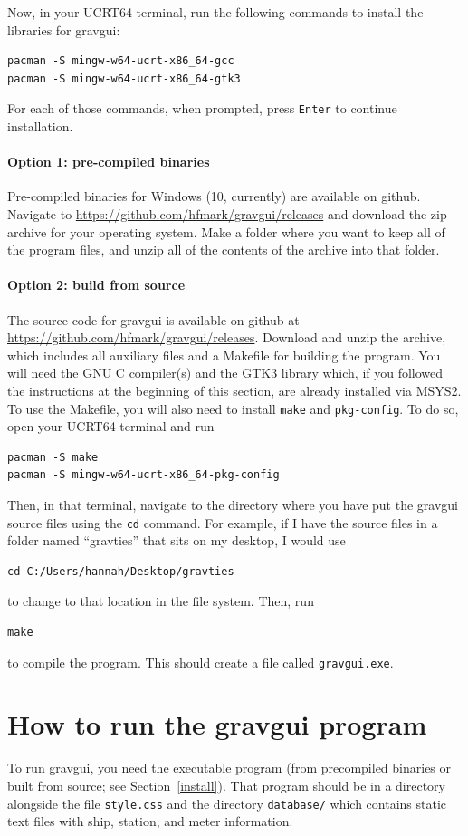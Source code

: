 \documentclass{pfpe-manual}
\begin{document}
Now, in your UCRT64 terminal, run the following commands to install the libraries for gravgui:
\begin{verbatim}
pacman -S mingw-w64-ucrt-x86_64-gcc
pacman -S mingw-w64-ucrt-x86_64-gtk3
\end{verbatim}
For each of those commands, when prompted, press \texttt{Enter} to continue installation.

\paragraph{Option 1: pre-compiled binaries}
Pre-compiled binaries for Windows (10, currently) are available on github. Navigate to \url{https://github.com/hfmark/gravgui/releases} and download the zip archive for your operating system. Make a folder where you want to keep all of the program files, and unzip all of the contents of the archive into that folder.

\paragraph{Option 2: build from source}
The source code for gravgui is available on github at \url{https://github.com/hfmark/gravgui/releases}. Download and unzip the archive, which includes all auxiliary files and a Makefile for building the program. You will need the GNU C compiler(s) and the GTK3 library which, if you followed the instructions at the beginning of this section, are already installed via MSYS2. To use the Makefile, you will also need to install \texttt{make} and \texttt{pkg-config}. To do so, open your UCRT64 terminal and run
\begin{verbatim}
pacman -S make
pacman -S mingw-w64-ucrt-x86_64-pkg-config
\end{verbatim}
Then, in that terminal, navigate to the directory where you have put the gravgui source files using the \texttt{cd} command. For example, if I have the source files in a folder named ``gravties'' that sits on my desktop, I would use
\begin{verbatim}
cd C:/Users/hannah/Desktop/gravties
\end{verbatim}
to change to that location in the file system. Then, run 
\begin{verbatim}
make
\end{verbatim}
to compile the program. This should create a file called \texttt{gravgui.exe}.

\section{How to run the gravgui program}
\label{run-gg}
To run gravgui, you need the executable program (from precompiled binaries or built from source; see Section~\ref{install}). That program should be in a directory alongside the file \texttt{style.css} and the directory \texttt{database/} which contains static text files with ship, station, and meter information.
\end{document}
